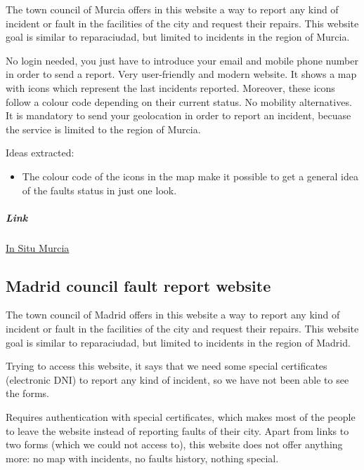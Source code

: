 The town council of Murcia offers in this website a way to report any kind of incident or fault in the facilities of the city and request their repairs. This website goal is similar to reparaciudad, but limited to incidents in the region of Murcia.

\begin{itemize}
\adv No login needed, you just have to introduce your email and mobile phone number in order to send a report.
\adv Very user-friendly and modern website.
\adv It shows a map with icons which represent the last incidents reported. Moreover, these icons follow a colour code depending on their current status.
\dsv No mobility alternatives.
\dsv It is mandatory to send your geolocation in order to report an incident, becuase the service is limited to the region of Murcia.
\end{itemize}

Ideas extracted:

\begin{itemize}
\item The colour code of the icons in the map make it possible to get a general idea of the faults status in just one look.
\end{itemize}

\subparagraph{Link} \href{http://www.insitumurcia.es}{In Situ Murcia}

\subsection{Madrid council fault report website}

The town council of Madrid offers in this website a way to report any kind of incident or fault in the facilities of the city and request their repairs. This website goal is similar to reparaciudad, but limited to incidents in the region of Madrid.

Trying to access this website, it says that we need some special certificates (electronic DNI) to report any kind of incident, so we have not been able to see the forms.

\begin{itemize}
\dsv Requires authentication with special certificates, which makes most of the people to leave the website instead of reporting faults of their city.
\dsv Apart from links to two forms (which we could not access to), this website does not offer anything more: no map with incidents, no faults history, nothing special.
\end{itemize}

